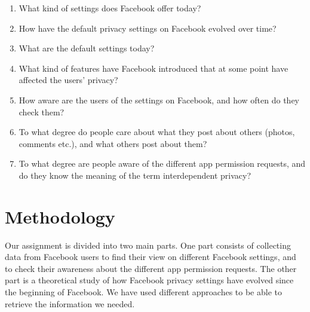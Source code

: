 \begin{enumerate}
\item What kind of settings does Facebook offer today?
\item How have the default privacy settings on Facebook evolved over time?
\item What are the default settings today?
\item What kind of features have Facebook introduced that at some point have affected the users' privacy?
\item How aware are the users of the settings on Facebook, and how often do they check them?
\item To what degree do people care about what they post about others (photos, comments etc.), and what others post about them? 
\item To what degree are people aware of the different app permission requests, and do they know the meaning of the term interdependent privacy?
\end{enumerate}



\section{Methodology}
\label{sec:methodology}
Our assignment is divided into two main parts. One part consists of collecting data from Facebook users to find their view on different Facebook settings, and to check their awareness about the different app permission requests. The other part is a theoretical study of how Facebook privacy settings have evolved since the beginning of Facebook. We have used different approaches to be able to retrieve the information we needed.

